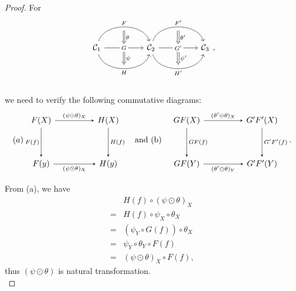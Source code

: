 \documentclass{article}
\begin{document}
\begin{proof}
	For
	\[\begin{tikzcd}
		\C_1
		\arrow[bend left=75, rr, "F", ""' name=F] \arrow[rr, "G" description, "" name=G, ""' name=GG] \arrow[bend right=75, rr, "H"', "" name=H] & &
		\arrow[Rightarrow, from=F, to=G, "\theta"] \arrow[Rightarrow, from=GG, to=H, "\psi"]
		\C_2 \arrow[bend left=75, rr, "F'", ""' name=F'] \arrow[rr, "G'" description, "" name=G', ""' name=GG'] \arrow[bend right=75, rr, "H'"', "" name=H'] & &
		\arrow[Rightarrow, from=F', to=G', "\theta'"] \arrow[Rightarrow, from=GG', to=H', "\psi'"] \C_3
	\end{tikzcd},\]\\
	we need to verify the following commutative diagrams:
		\[(a)\begin{tikzcd}
				F(X) \arrow[->,>=stealth,dd,"F(f)"'] \arrow[->,>=stealth,rr,"(\psi\odot\theta)_X"] && H(X) \arrow[->,>=stealth,dd,"H(f)"]\\ && \\
				F(y) \arrow[->,>=stealth,rr,"(\psi\odot\theta)_X"'] && H(y)
			\end{tikzcd}\quad\text{and (b)}\quad\begin{tikzcd}
				GF(X) \arrow[->,>=stealth,dd,"GF(f)"] \arrow[->,>=stealth,rr,"(\theta'\ominus\theta)_X"] && G'F'(X) \arrow[->,>=stealth,dd,"G'F'(f)"]\\ && \\
				GF(Y) \arrow[->,>=stealth,rr,"(\theta'\ominus\theta)_Y"'] && G'F'(Y)
		\end{tikzcd}.\]
	
	From (a), we have
	\begin{align*}
		& H(f)\circ(\psi\odot\theta)_X\\
		=& H(f)\circ\psi_X\circ\theta_X\tag{Def: vertical composition}\\
		=& (\psi_Y\circ G(f))\circ\theta_X\tag{Property of natural transformation $\psi$}\\
		=& \psi_Y\circ\theta_Y\circ F(f)\tag{Property of natural transformation $\theta$}\\
		=& (\psi\odot\theta)_X\circ F(f),\tag{Def: vertical composition}
	\end{align*}
	thus $(\psi\odot\theta)$ is natural transformation.\\
		

\end{proof}
\end{document}
